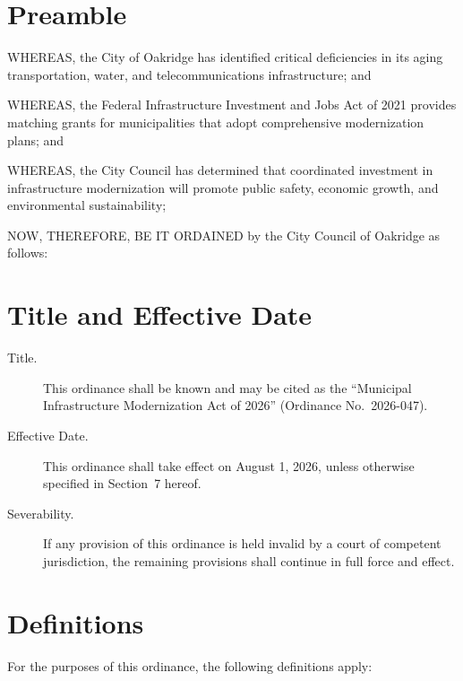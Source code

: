 \documentclass[
    language=english,
    doctype=article,
    institution=none,
]{../../omnilatex}
\begin{document}
\maketitle

\section*{Preamble}

WHEREAS, the City of Oakridge has identified critical deficiencies in its
aging transportation, water, and telecommunications infrastructure; and

WHEREAS, the Federal Infrastructure Investment and Jobs Act of 2021 provides
matching grants for municipalities that adopt comprehensive modernization
plans; and

WHEREAS, the City Council has determined that coordinated investment in
infrastructure modernization will promote public safety, economic growth,
and environmental sustainability;

NOW, THEREFORE, BE IT ORDAINED by the City Council of Oakridge as follows:

\section{Title and Effective Date}

\begin{description}
    \item[Title.] This ordinance shall be known and may be cited as the
        ``Municipal Infrastructure Modernization Act of 2026'' (Ordinance
        No.\ 2026-047).
    \item[Effective Date.] This ordinance shall take effect on August 1,
        2026, unless otherwise specified in Section~7 hereof.
    \item[Severability.] If any provision of this ordinance is held invalid
        by a court of competent jurisdiction, the remaining provisions shall
        continue in full force and effect.
\end{description}

\section{Definitions}

For the purposes of this ordinance, the following definitions apply:
\end{document}

